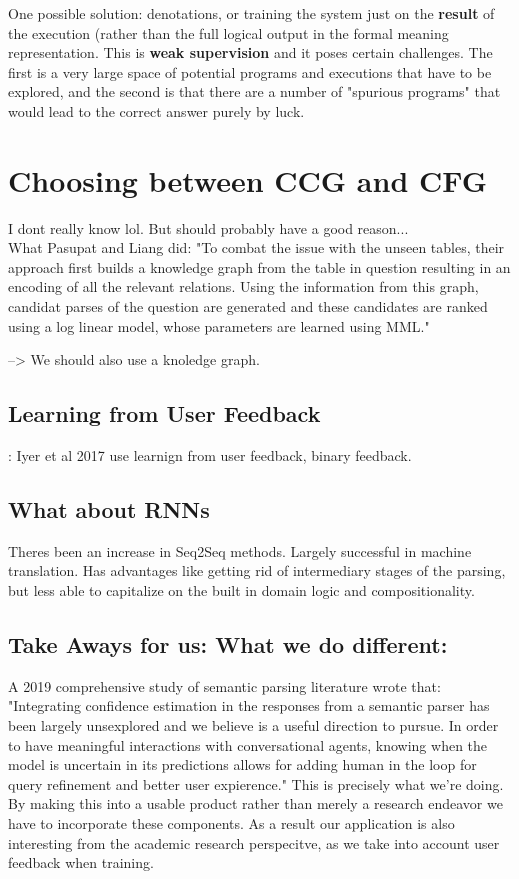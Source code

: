 \documentclass[pageno]{jpaper}
\begin{document}
One possible solution: denotations, or training the system just on the \textbf{result} of the execution (rather than the full logical output in the formal meaning representation. This is \textbf{weak supervision} and it poses certain challenges. The first is a very large space of potential programs and executions that have to be explored, and the second is that  there are a number of "spurious programs" that would lead to the correct answer purely by luck.


\section{Choosing between CCG and CFG}
I dont really know lol. But should probably have a good reason...
\\


What Pasupat and Liang did: "To combat the issue with the unseen tables, their approach first builds a knowledge graph from the table in question resulting in an encoding of all the relevant relations. Using the information from this graph, candidat parses of the question are generated and these candidates are ranked using a log linear model, whose parameters are learned using MML."

--> We should also use a knoledge graph.

\subsection{Learning from User Feedback}:
Iyer et al 2017 use learnign from user feedback, binary feedback.


\subsection{What about RNNs}
Theres been an increase in Seq2Seq methods. Largely successful in machine translation. Has advantages like getting rid of intermediary stages of the parsing, but less able to capitalize on the built in domain logic and compositionality.

\subsection{Take Aways for us: What we do different:}
A 2019 comprehensive study of semantic parsing literature wrote that:
"Integrating confidence estimation in the responses from a semantic parser has been largely unsexplored and we believe is a useful direction to pursue. In order to have meaningful interactions with conversational agents, knowing when the model is uncertain in its predictions allows for adding human in the loop for query refinement and better user expierence." This is precisely what we're doing. By making this into a usable product rather than merely a research endeavor we have to incorporate these components. As a result our application is also interesting from the academic research perspecitve, as we take into account user feedback when training.\\
\end{document}
